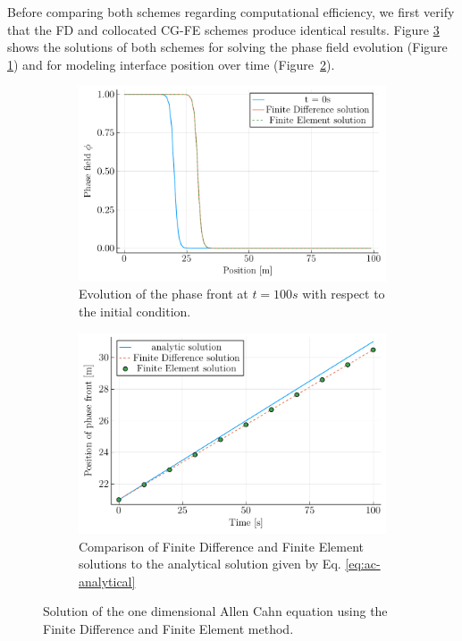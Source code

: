 \documentclass[asi,article,submit,moreauthors]{Definitions/mdpi}
\begin{document}
Before comparing both schemes regarding computational efficiency, we first verify that the FD and collocated CG-FE schemes produce identical results. Figure \ref{fig:ac-solutions} shows the solutions of both schemes for solving the phase field evolution (Figure \ref{fig:ac-phasefield}) and for modeling interface position over time (Figure~\ref{fig:ac-positions}).

\begin{figure}
     \centering
     \begin{subfigure}[t]{0.49\textwidth}
         \centering
         \includegraphics[width=\textwidth]{Figs/Examples/Allen-Cahn/phasefield.pdf}
         \caption{Evolution of the phase front at $t=100s$ with respect to the initial condition.}
         \label{fig:ac-phasefield}
     \end{subfigure}
     \hfill
     \begin{subfigure}[t]{0.49\textwidth}
         \centering
         \includegraphics[width=\textwidth]{Figs/Examples/Allen-Cahn/positions.pdf}
         \caption{Comparison of Finite Difference and Finite Element solutions to the analytical solution given by Eq. \ref{eq:ac-analytical}}
         \label{fig:ac-positions}
     \end{subfigure}
    \caption{Solution of the one dimensional Allen Cahn equation using the Finite Difference and Finite Element method.}
    \label{fig:ac-solutions}
\end{figure}
\end{document}
